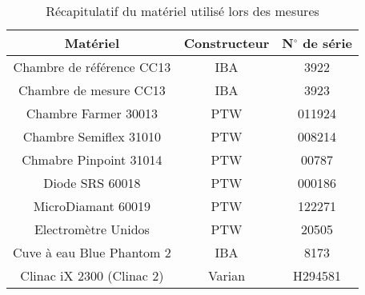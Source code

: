 \documentclass{article}
\begin{document}
\begin{table}[h]
  \centering
  \begin{tabular}{ccc}
    \toprule
    \textbf{Matériel} & \textbf{Constructeur} & \textbf{N}$\mathbf{^{\circ}}$\textbf{ de série}\\
    \toprule
    Chambre de référence CC13 & IBA & 3922 \\
    Chambre de mesure CC13 & IBA & 3923 \\
    Chambre Farmer 30013 & PTW & 011924 \\
    Chambre Semiflex 31010 & PTW & 008214 \\
    Chmabre Pinpoint 31014 & PTW & 00787 \\
    Diode SRS 60018 & PTW & 000186 \\
    MicroDiamant 60019 & PTW & 122271 \\
    Electromètre Unidos & PTW & 20505 \\
    Cuve à eau Blue Phantom 2 & IBA & 8173 \\
    Clinac iX 2300 (Clinac 2) & Varian & H294581 \\
    \bottomrule
  \end{tabular}
  \caption{Récapitulatif du matériel utilisé lors des mesures}
  \label{table_matos}
\end{table}
\end{document}
